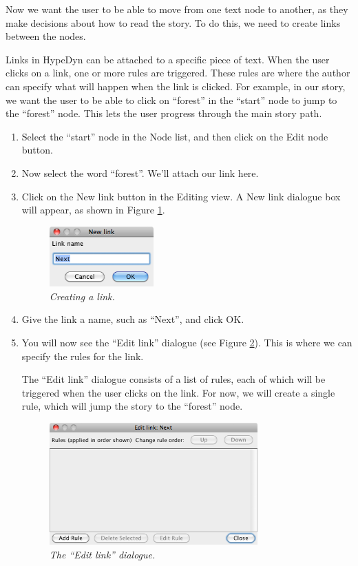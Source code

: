 \documentclass{article}
\begin{document}
Now we want the user to be able to move from one text node to another, as they
make decisions about how to read the story. To do this, we need to create links
between the nodes.

Links in HypeDyn can be attached to a specific piece of text. When the user
clicks on a link, one or more rules are triggered. These rules are where the
author can specify what will happen when the link is clicked. For example, in our
story, we want the user to be able to click on ``forest'' in the ``start'' node
to jump to the ``forest'' node. This lets the user progress through the main
story path.

\begin{enumerate}
  \item Select the ``start'' node in the Node list, and then click on the Edit
  node button.
  \item Now select the word ``forest''. We'll attach our link here.
  \item Click on the New link button in the Editing view. A New link dialogue
  box will appear, as shown in Figure \ref{fig:create_link}.

\begin{figure}[ht]
  \centering
  \includegraphics[width=4cm]{images/hypedyn-tutorial-1-figure-7}
  \caption{\textit{Creating a link.}}
  \label{fig:create_link}
\end{figure} 

\item Give the link a name, such as ``Next'', and click OK. \item You will now
see the ``Edit link'' dialogue (see Figure \ref{fig:edit_link_1}). This is where
we can specify the rules for the link.

The ``Edit link'' dialogue consists of a list of rules, each of which will be
triggered when the user clicks on the link. For now, we will create a single
rule, which will jump the story to the ``forest'' node.

\begin{figure}[ht]
  \centering
  \includegraphics[width=8cm]{images/hypedyn-tutorial-1-figure-8}
  \caption{\textit{The ``Edit link'' dialogue.}}
  \label{fig:edit_link_1}
\end{figure} 


\end{enumerate}
\end{document}
